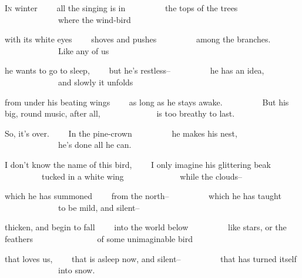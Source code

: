 
\begin{poem}
\begin{stanza}
\textsc{In} winter\verseline
~~~~all the singing is in\verseline
~~~~~~~~~the tops of the trees\verseline
~~~~~~~~~~~~~where the wind-bird
\end{stanza}

\begin{stanza}
with its white eyes\verseline
~~~~shoves and pushes\verseline
~~~~~~~~~among the branches.\verseline
~~~~~~~~~~~~~Like any of us
\end{stanza}

\begin{stanza}
he wants to go to sleep,\verseline
~~~~but he's restless--\verseline
~~~~~~~~~he has an idea,\verseline
~~~~~~~~~~~~~and slowly it unfolds
\end{stanza}

\begin{stanza}
from under his beating wings\verseline
~~~~as long as he stays awake.\verseline
~~~~~~~~~But his big, round music, after all,\verseline
~~~~~~~~~~~~~is too breathy to last.
\end{stanza}

\begin{stanza}
So, it's over.\verseline
~~~~In the pine-crown\verseline
~~~~~~~~~he makes his nest,\verseline
~~~~~~~~~~~~~he's done all he can.
\end{stanza}

\begin{stanza}
I don't know the name of this bird,\verseline
~~~~I only imagine his glittering beak\verseline
~~~~~~~~~tucked in a white wing\verseline
~~~~~~~~~~~~~while the clouds--
\end{stanza}

\begin{stanza}
which he has summoned\verseline
~~~~from the north--\verseline
~~~~~~~~~which he has taught\verseline
~~~~~~~~~~~~~to be mild, and silent--
\end{stanza}

\begin{stanza}
thicken, and begin to fall\verseline
~~~~into the world below\verseline
~~~~~~~~~like stars, or the feathers\verseline
~~~~~~~~~~~~~~~of some unimaginable bird
\end{stanza}

\begin{stanza}
that loves us,\verseline
~~~~that is asleep now, and silent--\verseline
~~~~~~~~~that has turned itself\verseline
~~~~~~~~~~~~~into snow.
\end{stanza}
\end{poem}